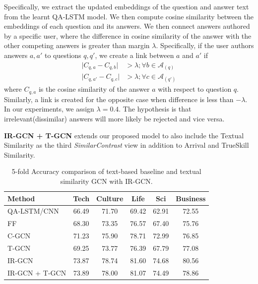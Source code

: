 Specifically, we extract the updated embeddings of the question and answer text from the learnt QA-LSTM model. We then compute cosine similarity between the embeddings of each question and its answers.
We then connect answers authored by a specific user, where the difference in cosine similarity of the answer with the other competing answers is greater than margin $\lambda$. Specifically, if the user authors answers $a, a'$ to questions $q, q'$, we create a link between $a$ and $a'$ if
\begin{align}
 \lvert C_{q,a} - C_{q, b} \rvert &> \lambda; \forall b \in \mathcal{A}_(q) \\
 \lvert C_{q,a'} - C_{q, c} \rvert &> \lambda; \forall c \in \mathcal{A}_(q')
\end{align}
where $C_{q,a}$ is the cosine similarity of the answer $a$ with respect to question $q$. Similarly, a link is created for the opposite case when difference is less than $-\lambda$. In our experiments, we assign $\lambda = 0.4$. The hypothesis is that irrelevant(dissimilar) answers will more likely be rejected and vice versa.

\noindent
\textbf{IR-GCN + T-GCN} extends our proposed model to also include the Textual Similarity as the third \textit{SimilarContrast} view in addition to Arrival and TrueSkill Similarity.

\begin{table}[h]
  \centering
  \begin{tabular}{l | S[round-mode=places,round-precision=2]S[round-mode=places,round-precision=2]S[round-mode=places,round-precision=2]S[round-mode=places,round-precision=2]S[round-mode=places,round-precision=2]}
    \toprule
    {Method} &
      {Tech} &
      {Culture} &
      {Life} &
      {Sci} &
      {Business}\\
      \midrule
    QA-LSTM/CNN\cite{Tan2015} & 66.49 & 71.70  & 69.42 & 62.91 & 72.55 \\
    FF~\cite{JendersKN16} & 68.30 & 73.35 & 76.57 & 67.40 & 75.76 \\
    C-GCN & 71.23 & 75.90 & 78.71 & 72.99 & 76.85 \\
    T-GCN & 69.25 & 73.77 & 76.39 & 67.79 & 77.08\\
    IR-GCN & 73.87 & 78.74 & 81.60 & 74.68 & 80.56 \\
    IR-GCN + T-GCN & 73.89 & 78.00  & 81.07 & 74.49 & 78.86\\
    \bottomrule
  \end{tabular}
  \caption{\label{tab:text} 5-fold Accuracy comparison of text-based baseline and textual similarity GCN with IR-GCN.}
\end{table}

